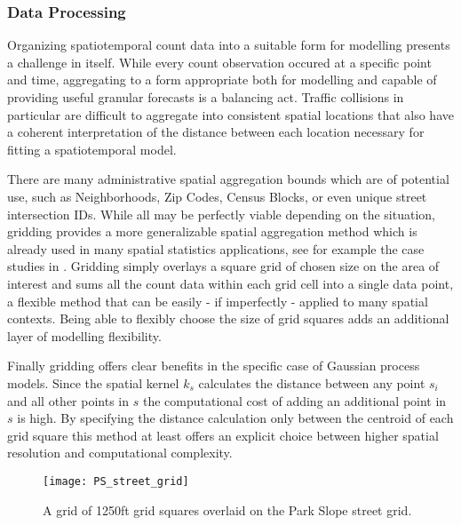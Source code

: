 \subsubsection{Data Processing}

Organizing spatiotemporal count data into a suitable form for modelling presents a challenge in itself. While every count observation occured at a specific point and time, aggregating to a form appropriate both for modelling and capable of providing useful granular forecasts is a balancing act. Traffic collisions in particular are difficult to aggregate into consistent spatial locations that also have a coherent interpretation of the distance between each location necessary for fitting a spatiotemporal model. \par

There are many administrative spatial aggregation bounds which are of potential use, such as Neighborhoods, Zip Codes, Census Blocks, or even unique street intersection IDs. While all may be perfectly viable depending on the situation, gridding provides a more generalizable spatial aggregation method which is already used in many spatial statistics applications, see for example the case studies in \cite{blangiardo_2015}. Gridding simply overlays a square grid of chosen size on the area of interest and sums all the count data within each grid cell into a single data point, a flexible method that can be easily - if imperfectly - applied to many spatial contexts. Being able to flexibly choose the size of grid squares adds an additional layer of modelling flexibility. \par

Finally gridding offers clear benefits in the specific case of Gaussian process models. Since the spatial kernel $k_s$ calculates the distance between any point $s_i$ and all other points in $s$ the computational cost of adding an additional point in $s$ is high. By specifying the distance calculation only between the centroid of each grid square this method at least offers an explicit choice between higher spatial resolution and computational complexity.


\begin{figure}[h!]
  \centering
  \caption{A grid of 1250ft grid squares overlaid on the Park Slope street grid.}
  \texttt{[image: PS\_street\_grid]}
\end{figure}
